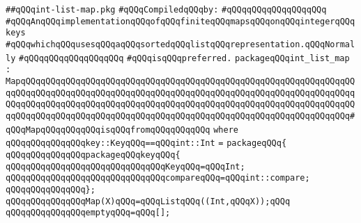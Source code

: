 \label{src/lib/src/int-list-map.pkg}
\verb|##qQQqint-list-map.pkg|\newline
\newline
\verb|#qQQqCompiledqQQqby:|\newline
\verb|#qQQqqQQqqQQqqQQqqQQq|\newline
\newline
\verb|#qQQqAnqQQqimplementationqQQqofqQQqfiniteqQQqmapsqQQqonqQQqintegerqQQqkeys|\newline
\verb|#qQQqwhichqQQqusesqQQqaqQQqsortedqQQqlistqQQqrepresentation.qQQqNormally|\newline
\verb|#qQQqqQQqqQQqqQQqqQQq|\newline
\verb|#qQQqisqQQqpreferred.|\newline
\newline
\newline
\verb|packageqQQqint_list_map|\newline
\verb|:|\newline
\verb|MapqQQqqQQqqQQqqQQqqQQqqQQqqQQqqQQqqQQqqQQqqQQqqQQqqQQqqQQqqQQqqQQqqQQqqQQqqQQqqQQqqQQqqQQqqQQqqQQqqQQqqQQqqQQqqQQqqQQqqQQqqQQqqQQqqQQqqQQqqQQqqQQqqQQqqQQqqQQqqQQqqQQqqQQqqQQqqQQqqQQqqQQqqQQqqQQqqQQqqQQqqQQqqQQqqQQqqQQqqQQqqQQqqQQqqQQqqQQqqQQqqQQqqQQqqQQqqQQqqQQqqQQqqQQqqQQqqQQq#qQQqMapqQQqqQQqqQQqisqQQqfromqQQqqQQqqQQq|\newline
\verb|where|\newline
\verb|qQQqqQQqqQQqqQQqkey::KeyqQQq==qQQqint::Int|\newline
\verb|=|\newline
\verb|packageqQQq{|\newline
\verb|qQQqqQQqqQQqqQQqpackageqQQqkeyqQQq{|\newline
\verb|qQQqqQQqqQQqqQQqqQQqqQQqqQQqqQQqKeyqQQq=qQQqInt;|\newline
\verb|qQQqqQQqqQQqqQQqqQQqqQQqqQQqqQQqcompareqQQq=qQQqint::compare;|\newline
\verb|qQQqqQQqqQQqqQQq};|\newline
\newline
\verb|qQQqqQQqqQQqqQQqMap(X)qQQq=qQQqListqQQq((Int,qQQqX));qQQq|\newline
\newline
\verb|qQQqqQQqqQQqqQQqemptyqQQq=qQQq[];|\newline
\newline
